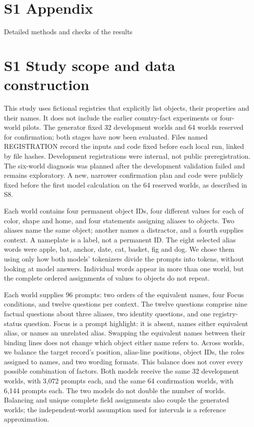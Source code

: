 \documentclass[10pt,letterpaper]{article}
\begin{document}

\fancyheadoffset[L]{0in}\fancyfootoffset[L]{0in}

\section*{S1 Appendix}

Detailed methods and checks of the results

\linenumbers

\section*{S1 Study scope and data construction}

This study uses fictional registries that explicitly list objects, their properties and their names. It does not include the earlier country-fact experiments or four-world pilots. The generator fixed 32 development worlds and 64 worlds reserved for confirmation; both stages have now been evaluated. Files named REGISTRATION record the inputs and code fixed before each local run, linked by file hashes. Development registrations were internal, not public preregistration. The six-world diagnosis was planned after the development validation failed and remains exploratory. A new, narrower confirmation plan and code were publicly fixed before the first model calculation on the 64 reserved worlds, as described in S8.


Each world contains four permanent object IDs, four different values for each of color, shape and home, and four statements assigning aliases to objects. Two aliases name the same object; another names a distractor, and a fourth supplies context. A nameplate is a label, not a permanent ID. The eight selected alias words were apple, bat, anchor, date, cat, basket, fig and dog. We chose them using only how both models' tokenizers divide the prompts into tokens, without looking at model answers. Individual words appear in more than one world, but the complete ordered assignments of values to objects do not repeat.


Each world supplies 96 prompts: two orders of the equivalent names, four Focus conditions, and twelve questions per context. The twelve questions comprise nine factual questions about three aliases, two identity questions, and one registry-status question. Focus is a prompt highlight: it is absent, names either equivalent alias, or names an unrelated alias. Swapping the equivalent names between their binding lines does not change which object either name refers to. Across worlds, we balance the target record's position, alias-line positions, object IDs, the roles assigned to names, and two wording formats. This balance does not cover every possible combination of factors. Both models receive the same 32 development worlds, with 3,072 prompts each, and the same 64 confirmation worlds, with 6,144 prompts each. The two models do not double the number of worlds. Balancing and unique complete field assignments also couple the generated worlds; the independent-world assumption used for intervals is a reference approximation.
\end{document}
